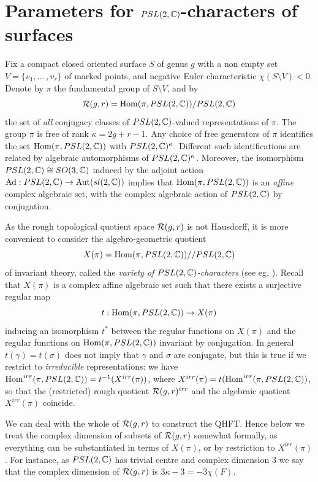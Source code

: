 \section{ Parameters for $PSL(2,{\mathbb C})$-characters of surfaces}
\label{PARAM} Fix a compact closed oriented surface $S$ of genus
$g$ with a non empty set $V= \{v_1,\dots \ , v_r\}$ of marked
points, and negative Euler characteristic $\chi(S\setminus V)<0$.
Denote by $\pi$ the fundamental group of $S\setminus V$, and by
$${\mathcal R}(g,r) = {\rm Hom}(\pi, PSL(2,{\mathbb C}))/PSL(2,{\mathbb C})$$ the set of {\it
all} conjugacy classes of $PSL(2,{\mathbb C})$-valued representations of
$\pi$. The group $\pi$ is free of rank $\kappa = 2g + r -1$. Any
choice of free generators of $\pi$ identifies the set ${\rm
Hom}(\pi, PSL(2,{\mathbb C}))$ with $PSL(2,{\mathbb C})^\kappa$. Different such
identifications are related by algebraic automorphisms of
$PSL(2,{\mathbb C})^\kappa$.  Moreover, the isomorphism $PSL(2,{\mathbb C})\cong
SO(3,{\mathbb C})$ induced by the adjoint action ${\rm Ad}: PSL(2,\mathbb{C})
\rightarrow {\rm Aut}(sl(2,\mathbb{C}))$ implies that ${\rm Hom}(\pi,
PSL(2,{\mathbb C}))$ is an {\it affine} complex algebraic set, with the
complex algebraic action of $PSL(2,{\mathbb C})$ by conjugation.

As the rough topological quotient space ${\mathcal R}(g,r)$ is not
Hausdorff, it is more convenient to consider the algebro-geometric
quotient $$X(\pi)={\rm
  Hom}(\pi, PSL(2,{\mathbb C}))//PSL(2,{\mathbb C})$$ of invariant theory, called the
{\it variety of $PSL(2,{\mathbb C})$-characters} (see eg. \cite{HP}).
Recall that $X(\pi)$ is a complex affine algebraic set such that
there exists a surjective regular map $$t:{\rm Hom}(\pi,
PSL(2,{\mathbb C}))\to X(\pi)$$ inducing an isomorphism $t^*$ between the
regular functions on $X(\pi)$ and the regular functions on ${\rm
Hom}(\pi, PSL(2,{\mathbb C}))$ invariant by conjugation. In general
$t(\gamma)=t(\sigma)$ does not imply that $\gamma$ and $\sigma$
are conjugate, but this is true if we restrict to {\it
irreducible} representations: we have ${\rm
  Hom}^{irr}(\pi, PSL(2,{\mathbb C})) = t^{-1}(X^{irr}(\pi))$, where
$X^{irr}(\pi)= t({\rm Hom}^{irr}(\pi, PSL(2,{\mathbb C}))$, so that the
(restricted) rough quotient ${\mathcal R}(g,r)^{irr}$ and the algebraic
quotient $X^{irr}(\pi)$ coincide.

 We can deal with the whole of ${\mathcal R}(g,r)$ to construct
the QHFT. Hence below we treat the complex dimension of subsets of
${\mathcal R}(g,r)$ somewhat formally, as everything can be substantiated
in terms of $X(\pi)$, or by restriction to $X^{irr}(\pi)$. For
instance, as $PSL(2,{\mathbb C})$ has trivial centre and complex dimension
$3$ we say that the complex dimension of ${\mathcal R}(g,r)$ is $3\kappa -
3 = -3\chi(F)$.
